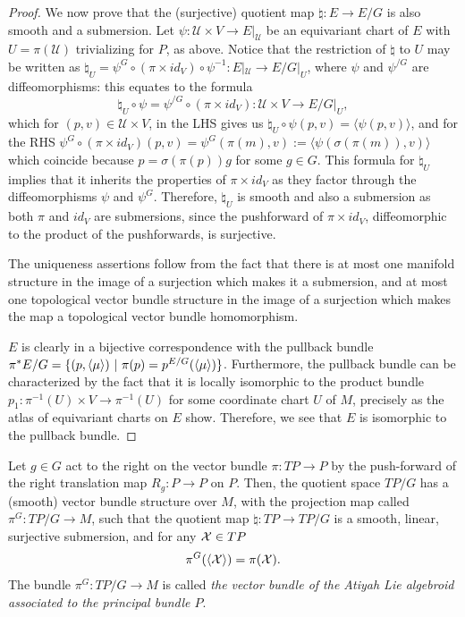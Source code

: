 \begin{proof}
We now prove that the (surjective) quotient map $\natural : E \to E/G$ is also smooth and a submersion. Let $\psi: \mathcal U \times V \to E|_{\mathcal U}$ be an equivariant chart of $E$ with $U = \pi(\mathcal U)$ trivializing for $P$, as above. Notice that the restriction of $\natural$ to $U$ may be written as $\natural_U = \psi^{G} \circ (\pi \times id_V) \circ \psi^{-1}: E|_{\mathcal U} \to E/G|_U$, where $\psi$ and $\psi^{/G}$ are diffeomorphisms: this equates to the formula \[\natural_U \circ \psi = \psi^{/G} \circ (\pi \times id_V): \mathcal U \times V \to E/G|_U,\] which for $(p, v) \in \mathcal U \times V$, in the LHS gives us $\natural_U \circ \psi(p, v) = \langle\psi(p, v)\rangle$, and for the RHS $\psi^{G} \circ (\pi \times id_V) (p, v) = \psi^{G}(\pi(m), v) := \langle\psi(\sigma(\pi(m)), v)\rangle$ which coincide because $p = \sigma(\pi(p))g$ for some $g \in G$. This formula for $\natural_U$ implies that it inherits the properties of $\pi \times id_V$ as they factor through the diffeomorphisms $\psi$ and $\psi^G$. Therefore, $\natural_U$ is smooth and also a submersion as both $\pi$ and $id_V$ are submersions, since the pushforward of $\pi \times id_V$, diffeomorphic to the product of the pushforwards, is surjective.

The uniqueness assertions follow from the fact that there is at most one manifold structure in the image of a surjection which makes it a submersion, and at most one topological vector bundle structure in the image of a surjection which makes the map a topological vector bundle homomorphism.

$E$ is clearly in a bijective correspondence with the pullback bundle $\pi^*E/G = \{(p, \left\langle \mu \right\rangle) \ |\  \pi(p) = p^{E/G}(\left\langle \mu \right\rangle)\}$. Furthermore, the pullback bundle can be characterized by the fact that it is locally isomorphic to the product bundle $p_1: \pi^{-1}(U) \times V \to \pi^{-1}(U)$ for some coordinate chart $U$ of $M$, precisely as the atlas of equivariant charts on $E$ show. Therefore, we see that $E$ is isomorphic to the pullback bundle.
\end{proof}

\begin{theorem}\label{theoTPGexists}
Let $g \in G$ act to the right on the vector bundle $\pi:TP \to P$ by the push-forward of the right translation map $R_g: P \to P$ on $P$. Then, the quotient space $TP/G$ has a (smooth) vector bundle structure over $M$, with the projection map called $\pi^G: TP/G \to M$, such that the quotient map $\natural: TP \to TP/G$ is a smooth, linear, surjective submersion, and for any $\mathcal{X} \in TP$
\begin{align}\label{eqnProjectionAtiyah}
\pi^G(\left\langle \mathcal{X} \right\rangle) = \pi(\mathcal{X}).    
\end{align}
The bundle $\pi^G:TP/G \to M$ is called \emph{the vector bundle of the Atiyah Lie algebroid associated to the principal bundle $P$}.
\end{theorem}

